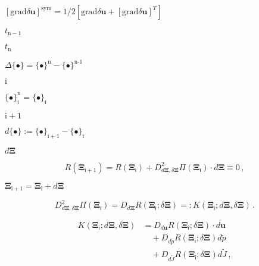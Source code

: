 \documentclass{article}
\begin{document}
$[\mathrm{grad}\delta\mathbf{u}]^{\text{sym}} = 1/2[ \mathrm{grad}\delta\mathbf{u} + [\mathrm{grad}\delta\mathbf{u}]^T] $
\pagebreak

$t_{\textrm{n}-1}$
\pagebreak

$t_{\textrm{n}}$
\pagebreak

$\varDelta \{ \bullet \} = { \{ \bullet \} }^{\textrm{n}} - { \{ \bullet \} }^{\textrm{n-1}}$
\pagebreak

$\textrm{i}$
\pagebreak

${ \{ \bullet \} }^{\textrm{n}}_{\textrm{i}} = { \{ \bullet \} }_{\textrm{i}}$
\pagebreak

$\textrm{i}+1$
\pagebreak

$d \{ \bullet \} := \{ \bullet \}_{\textrm{i}+1} - \{ \bullet \}_{\textrm{i}}$
\pagebreak

$d \mathbf{\Xi}$
\pagebreak

\[ R(\mathbf{\Xi}_{\mathsf{i}+1}) = R(\mathbf{\Xi}_{\mathsf{i}}) + D^2_{d \mathbf{\Xi}, \delta \mathbf{\Xi}} \Pi(\mathbf{\Xi_{\mathsf{i}}}) \cdot d \mathbf{\Xi} \equiv 0 \, , \]
\pagebreak

$\mathbf{\Xi}_{\textrm{i}+1} = \mathbf{\Xi}_{\textrm{i}} + d \mathbf{\Xi}$
\pagebreak

\[ D^2_{d \mathbf{\Xi}, \delta \mathbf{\Xi}} \Pi( \mathbf{\Xi}_{\mathsf{i}} ) = D_{d \mathbf{\Xi}} R( \mathbf{\Xi}_{\mathsf{i}}; \delta \mathbf{\Xi}) =: K(\mathbf{\Xi}_{\mathsf{i}}; d \mathbf{\Xi}, \delta \mathbf{\Xi}) \, . \]
\pagebreak

\begin{align*} K(\mathbf{\Xi}_{\mathsf{i}}; d \mathbf{\Xi}, \delta \mathbf{\Xi}) &= D_{d \mathbf{u}} R( \mathbf{\Xi}_{\mathsf{i}}; \delta \mathbf{\Xi}) \cdot d \mathbf{u} \\ &\quad + D_{d \widetilde{p}} R( \mathbf{\Xi}_{\mathsf{i}}; \delta \mathbf{\Xi}) d \widetilde{p} \\ &\quad + D_{d \widetilde{J}} R( \mathbf{\Xi}_{\mathsf{i}}; \delta \mathbf{\Xi}) d \widetilde{J} \, , \end{align*}
\pagebreak
\end{document}
